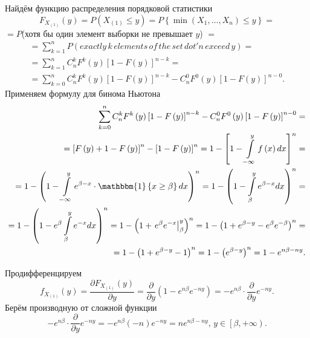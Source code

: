 Найдём функцию распределения порядковой статистики
$$F_{X_{ \left( 1 \right) }} \left( y \right) =
  P \left( X_{ \left( 1 \right) } \leq y \right) =
  P \left\{ \min \left( X_1, \dotsc, X_n \right) \leq y \right\} =$$
$=P$(хотя бы один элемент выборки не превышает $y$) $=$
\begin{equation*}
  \begin{split}
    = \sum \limits_{k = 1}^n
      P \left( exactly \, k \, elements \, of \, the \, set \, dot'n \, exceed \, y \right) = \\
    = \sum \limits_{k = 1}^n
      C_n^k F^k \left( y \right) \left[ 1 - F \left( y \right) \right]^{n - k} = \\
    = \sum \limits_{k = 0}^n
      C_n^k F^k \left( y \right) \left[ 1 - F \left( y \right) \right]^{n - k} -
    C_n^0 F^0 \left( y \right) \left[ 1 - F \left( y \right) \right]^{n - 0}.
  \end{split}
\end{equation*}
Применяем формулу для бинома Ньютона
\begin{equation*}
  \begin{split}
    \sum \limits_{k = 0}^n
      C_n^k F^k \left( y \right) \left[ 1 - F \left( y \right) \right]^{n - k} -
    C_n^0 F^0 \left( y \right) \left[ 1 - F \left( y \right) \right]^{n - 0} = \\
    = \left[ F \left( y \right) + 1 - F \left( y \right) \right]^n -
    \left[ 1 - F \left( y \right) \right]^n =
    1 - \left[ 1 - \int \limits_{- \infty }^y f \left( x \right) dx \right]^n = \\
    = 1 -
    \left(
      1 -
      \int \limits_{- \infty }^y e^{ \beta - x} \cdot \mathbbm{1} \left\{ x \geq \beta \right\} dx
    \right)^n =
    1 - \left( 1 - \int \limits_{ \beta }^y e^{ \beta - x} dx \right)^n = \\
    = 1 - \left( 1 - e^{ \beta } \int \limits_{ \beta }^y e^{-x} dx \right)^n =
    1 - \left( 1 + \left. e^{ \beta } e^{-x} \right|_{ \beta }^y \right)^n =
    1 - \left( 1 + e^{ \beta - y} - e^{ \beta } e^{- \beta } \right)^n = \\
    = 1 - \left( 1 + e^{ \beta - y} - 1 \right)^n =
    1 - \left( e^{ \beta - y} \right)^n =
    1 - e^{n \beta - ny}.
  \end{split}
\end{equation*}

Продифференцируем
$$f_{X_{ \left( 1 \right) }} \left( y \right) =
  \frac{ \partial F_{X_{ \left( 1 \right) }} \left( y \right) }{ \partial y} =
  \frac{ \partial }{ \partial y} \left( 1 - e^{n \beta } e^{-ny} \right) =
  -e^{n \beta } \cdot \frac{ \partial }{ \partial y} e^{-ny}.$$
Берём производную от сложной функции
$$-e^{n \beta } \cdot \frac{ \partial }{ \partial y} e^{-ny} =
  -e^{n \beta } \left( -n \right) e^{-ny} =
  ne^{ n \beta - ny}, \,
  y \in \left[ \beta, + \infty \right).$$

